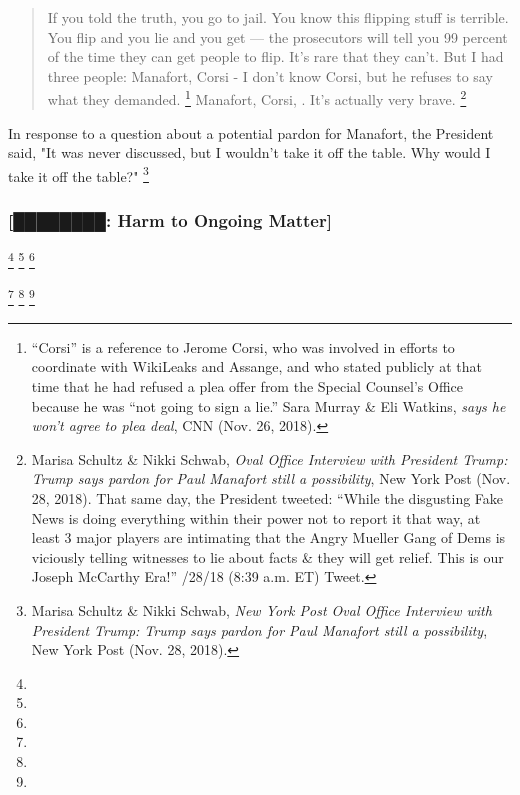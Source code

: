 \begin{quote}
If you told the truth, you go to jail.
You know this flipping stuff is terrible.
You flip and you lie and you get — the prosecutors will tell you 99 percent of the time they can get people to flip.
It's rare that they can't.
But I had three people: Manafort, Corsi - I don't know Corsi, but he refuses to say what they demanded.%
\footnote{“Corsi” is a reference to Jerome Corsi,  who was involved in efforts to coordinate with WikiLeaks and Assange, and who stated publicly at that time that he had refused a plea offer from the Special Counsel’s Office because he was “not going to sign a lie.”
Sara Murray \& Eli Watkins,  \textit{says he won't agree to plea deal}, CNN (Nov. 26, 2018).}
Manafort, Corsi, .
It's actually very brave.%
\footnote{Marisa Schultz \& Nikki Schwab, \textit{Oval Office Interview with President Trump: Trump says pardon for Paul Manafort still a possibility}, New York Post (Nov. 28, 2018).
That same day, the President tweeted: “While the disgusting Fake News is doing everything within their power not to report it that way, at least 3 major players are intimating that the Angry Mueller Gang of Dems is viciously telling witnesses to lie about facts \& they will get relief.
This is our Joseph McCarthy Era!” /28/18 (8:39 a.m. ET) Tweet.}
\end{quote}

In response to a question about a potential pardon for Manafort, the President said, "It was never discussed, but I wouldn't take it off the table.
Why would I take it off the table?"%
\footnote{Marisa Schultz \& Nikki Schwab, \textit{New York Post Oval Office Interview with President Trump: Trump says pardon for Paul Manafort still a possibility}, New York Post (Nov. 28, 2018).}

\subsubsection{[████████: Harm to Ongoing Matter]}

\footnote{}
\footnote{}
\footnote{}

\footnote{}
\footnote{}
\footnote{}


